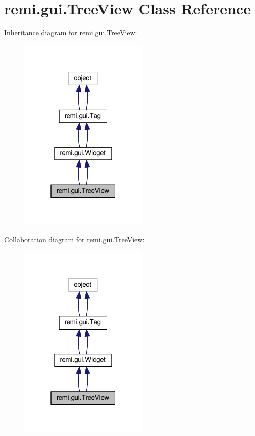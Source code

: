 \hypertarget{classremi_1_1gui_1_1TreeView}{}\section{remi.\+gui.\+Tree\+View Class Reference}
\label{classremi_1_1gui_1_1TreeView}


Inheritance diagram for remi.\+gui.\+Tree\+View\+:
\nopagebreak
\begin{figure}[H]
\begin{center}
\leavevmode
\includegraphics[width=175pt]{d8/d67/classremi_1_1gui_1_1TreeView__inherit__graph}
\end{center}
\end{figure}


Collaboration diagram for remi.\+gui.\+Tree\+View\+:
\nopagebreak
\begin{figure}[H]
\begin{center}
\leavevmode
\includegraphics[width=175pt]{da/dc0/classremi_1_1gui_1_1TreeView__coll__graph}
\end{center}
\end{figure}
